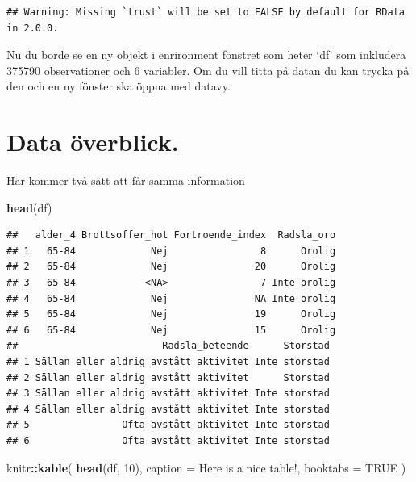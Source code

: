 \documentclass[
]{book}
\newenvironment{Shaded}{\begin{snugshade}}{\end{snugshade}}
\newcommand{\AttributeTok}[1]{\textcolor[rgb]{0.13,0.29,0.53}{#1}}
\newcommand{\ConstantTok}[1]{\textcolor[rgb]{0.56,0.35,0.01}{#1}}
\newcommand{\DecValTok}[1]{\textcolor[rgb]{0.00,0.00,0.81}{#1}}
\newcommand{\FunctionTok}[1]{\textcolor[rgb]{0.13,0.29,0.53}{\textbf{#1}}}
\newcommand{\NormalTok}[1]{#1}
\newcommand{\SpecialCharTok}[1]{\textcolor[rgb]{0.81,0.36,0.00}{\textbf{#1}}}
\newcommand{\StringTok}[1]{\textcolor[rgb]{0.31,0.60,0.02}{#1}}
\begin{document}
\begin{verbatim}
## Warning: Missing `trust` will be set to FALSE by default for RData in 2.0.0.
\end{verbatim}

Nu du borde se en ny objekt i enrironment fönstret som heter `df' som inkludera 375790 observationer och 6 variabler. Om du vill titta på datan du kan trycka på den och en ny fönster ska öppna med datavy.

\section{Data överblick.}\label{data-uxf6verblick.}

Här kommer två sätt att får samma information

\begin{Shaded}
\begin{Highlighting}[]
\FunctionTok{head}\NormalTok{(df)}
\end{Highlighting}
\end{Shaded}

\begin{verbatim}
##   alder_4 Brottsoffer_hot Fortroende_index  Radsla_oro
## 1   65-84             Nej                8      Orolig
## 2   65-84             Nej               20      Orolig
## 3   65-84            <NA>                7 Inte orolig
## 4   65-84             Nej               NA Inte orolig
## 5   65-84             Nej               19      Orolig
## 6   65-84             Nej               15      Orolig
##                         Radsla_beteende      Storstad
## 1 Sällan eller aldrig avstått aktivitet Inte storstad
## 2 Sällan eller aldrig avstått aktivitet      Storstad
## 3 Sällan eller aldrig avstått aktivitet Inte storstad
## 4 Sällan eller aldrig avstått aktivitet Inte storstad
## 5                Ofta avstått aktivitet Inte storstad
## 6                Ofta avstått aktivitet Inte storstad
\end{verbatim}

\begin{Shaded}
\begin{Highlighting}[]
\NormalTok{knitr}\SpecialCharTok{::}\FunctionTok{kable}\NormalTok{(}
  \FunctionTok{head}\NormalTok{(df, }\DecValTok{10}\NormalTok{), }\AttributeTok{caption =} \StringTok{\textquotesingle{}Here is a nice table!\textquotesingle{}}\NormalTok{,}
  \AttributeTok{booktabs =} \ConstantTok{TRUE}
\NormalTok{)}
\end{Highlighting}
\end{Shaded}
\end{document}
